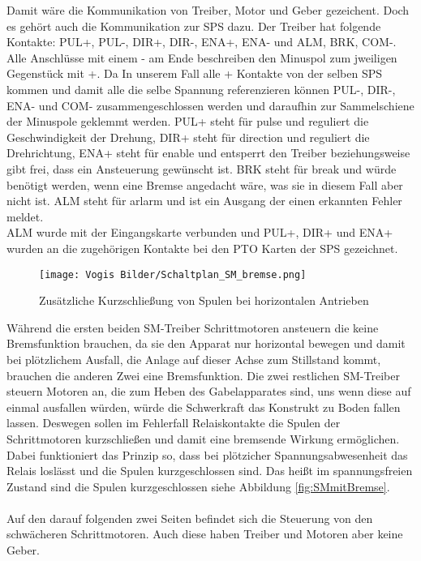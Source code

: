     Damit wäre die Kommunikation von Treiber, Motor und Geber gezeichent. Doch es gehört auch die Kommunikation zur SPS dazu. Der Treiber hat folgende Kontakte: PUL+, PUL-, DIR+, DIR-, ENA+, ENA- und ALM, BRK, COM-. Alle Anschlüsse mit einem - am Ende beschreiben den Minuspol zum jweiligen Gegenstück mit +. Da In unserem Fall alle + Kontakte von der selben SPS kommen und damit alle die selbe Spannung referenzieren können PUL-, DIR-, ENA- und COM- zusammengeschlossen werden und daraufhin zur Sammelschiene der Minuspole geklemmt werden. PUL+ steht für pulse und reguliert die Geschwindigkeit der Drehung,  DIR+ steht für direction und reguliert die Drehrichtung, ENA+ steht für enable und entsperrt den Treiber beziehungsweise gibt frei, dass ein Ansteuerung gewünscht ist. BRK steht für break und würde benötigt werden, wenn eine Bremse angedacht wäre, was sie in diesem Fall aber nicht ist. ALM steht für arlarm und ist ein Ausgang der einen erkannten Fehler meldet.\\
    ALM wurde mit der Eingangskarte verbunden und PUL+, DIR+ und ENA+ wurden an die zugehörigen Kontakte bei den PTO Karten der SPS gezeichnet.\\     
    \begin{figure}[h]
        \centering
        \texttt{[image: Vogis Bilder/Schaltplan\_SM\_bremse.png]}
        \caption{Zusätzliche Kurzschließung von Spulen bei horizontalen Antrieben}
        \label{fig:SMmitBrems}
    \end{figure}
    Während die ersten beiden SM-Treiber Schrittmotoren ansteuern die keine Bremsfunktion brauchen, da sie den Apparat nur horizontal bewegen und damit bei plötzlichem Ausfall, die Anlage auf dieser Achse zum Stillstand kommt, brauchen die anderen Zwei eine Bremsfunktion. Die zwei restlichen SM-Treiber steuern Motoren an, die zum Heben des Gabelapparates sind, uns wenn diese auf einmal ausfallen würden, würde die Schwerkraft das Konstrukt zu Boden fallen lassen. Deswegen sollen im Fehlerfall Relaiskontakte die Spulen der Schrittmotoren kurzschließen und damit eine bremsende Wirkung ermöglichen. Dabei funktioniert das Prinzip so, dass bei plötzicher Spannungsabwesenheit das Relais loslässt und die Spulen kurzgeschlossen sind. Das heißt im spannungsfreien Zustand sind die Spulen kurzgeschlossen siehe Abbildung \ref{fig:SMmitBremse}.\\\\ 
    Auf den darauf folgenden zwei Seiten befindet sich die Steuerung von den schwächeren Schrittmotoren. Auch diese haben Treiber und Motoren aber keine Geber.\\
